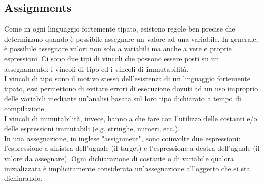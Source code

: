 \subsection{Assignments}
Come in ogni linguaggio fortemente tipato, esistono regole ben precise che determinano
quando è possibile assegnare un valore ad una variabile. In generale, è possibile assegnare 
valori non solo a variabili ma anche a vere e proprie espressioni. Ci sono due tipi di vincoli
che possono essere posti su un assegnamento: i vincoli di tipo ed i vincoli di immutabilità. \\

I vincoli di tipo sono il motivo stesso dell'esistenza di un linguaggio fortemente tipato,
essi permettono di evitare errori di esecuzione dovuti ad un uso improprio delle variabili
mediante un'analisi basata sul loro tipo dichiarato a tempo di compilazione. \\

I vincoli di immutabilità, invece, hanno a che fare con l'utilizzo delle costanti e/o
delle espressioni immutabili (e.g. stringhe, numeri, ecc.). \\

In una assegnazione, in inglese "assignment", sono coinvolte due espressioni: l'espressione a sinistra
dell'uguale (il target) e l'espressione a destra dell'uguale (il valore da assegnare). Ogni dichiarazione
di costante o di variabile qualora inizializzata è implicitamente considerata un'assegnazione
all'oggetto che si sta dichiarando.








